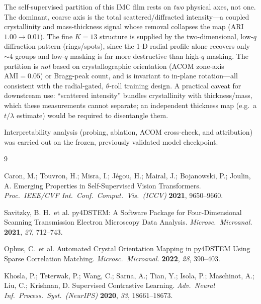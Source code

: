 \documentclass[journal=cmatex,manuscript=article,layout=twocolumn]{achemso}
\begin{document}
The self-supervised partition of this IMC film rests on \emph{two} physical
axes, not one. The dominant, coarse axis is the total scattered/diffracted
intensity---a coupled crystallinity and mass-thickness signal whose removal
collapses the map (ARI $1.00\rightarrow0.01$). The fine $K=13$ structure is
supplied by the two-dimensional, low-$q$ diffraction pattern (rings/spots),
since the 1-D radial profile alone recovers only $\sim4$ groups and low-$q$
masking is far more destructive than high-$q$ masking. The partition is
\emph{not} based on crystallographic orientation (ACOM zone-axis
$\mathrm{AMI}=0.05$) or Bragg-peak count, and is invariant to in-plane
rotation---all consistent with the radial-gated, $\theta$-roll training
design. A practical caveat for downstream use: ``scattered intensity'' bundles
crystallinity with thickness/mass, which these measurements cannot separate;
an independent thickness map (e.g.\ a $t/\lambda$ estimate) would be required
to disentangle them.

\begin{acknowledgement}
Interpretability analysis (probing, ablation, ACOM cross-check, and
attribution) was carried out on the frozen, previously validated model
checkpoint.
\end{acknowledgement}

\begin{thebibliography}{9}

Caron, M.; Touvron, H.; Misra, I.; J\'egou, H.; Mairal, J.; Bojanowski, P.;
Joulin, A. Emerging Properties in Self-Supervised Vision Transformers.
\emph{Proc.\ IEEE/CVF Int.\ Conf.\ Comput.\ Vis.\ (ICCV)} \textbf{2021},
9650--9660.

Savitzky, B. H.\ et al. py4DSTEM: A Software Package for Four-Dimensional
Scanning Transmission Electron Microscopy Data Analysis. \emph{Microsc.\
Microanal.} \textbf{2021}, \emph{27}, 712--743.

Ophus, C.\ et al. Automated Crystal Orientation Mapping in py4DSTEM Using
Sparse Correlation Matching. \emph{Microsc.\ Microanal.} \textbf{2022},
\emph{28}, 390--403.

Khosla, P.; Teterwak, P.; Wang, C.; Sarna, A.; Tian, Y.; Isola, P.;
Maschinot, A.; Liu, C.; Krishnan, D. Supervised Contrastive Learning.
\emph{Adv.\ Neural Inf.\ Process.\ Syst.\ (NeurIPS)} \textbf{2020},
\emph{33}, 18661--18673.

\end{thebibliography}
\end{document}
